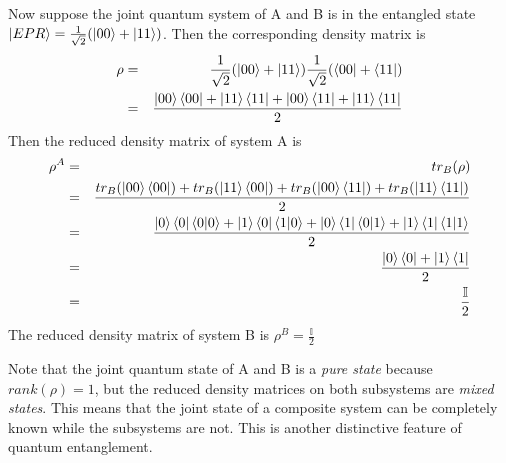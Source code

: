 \begin{example}
Now suppose the joint quantum system of A and B is in the entangled state $\ket{EPR}=\frac{1}{\sqrt{2}}(\ket{00}+\ket{11})$. Then the corresponding density matrix is
\begin{eqnarray}
\rho&=&\frac{1}{\sqrt{2}}(\ket{00}+\ket{11})\frac{1}{\sqrt{2}}(\bra{00}+\bra{11})\\
&=& \frac{\ket{00}\bra{00}+\ket{11}\bra{11}+\ket{00}\bra{11}+\ket{11}\bra{11}}{2}
\end{eqnarray}
Then the reduced density matrix of system A is 
\begin{eqnarray}
\rho^A&=&tr_B(\rho)\\
&=&\frac{tr_B(\ket{00}\bra{00})+tr_B(\ket{11}\bra{00})+tr_B(\ket{00}\bra{11})+tr_B(\ket{11}\bra{11})}{2}\\
&=&\frac{\ket{0}\bra{0}\braket{0|0}+\ket{1}\bra{0}\braket{1|0}+\ket{0}\bra{1}\braket{0|1}+\ket{1}\bra{1}\braket{1|1}}{2}\\
&=&\frac{\ket{0}\bra{0}+\ket{1}\bra{1}}{2}\\
&=&\frac{\mathbb{I}}{2}
\end{eqnarray}
The reduced density matrix of system B is $\rho^B=\frac{\mathbb{I}}{2}$
\end{example}
Note that the joint quantum state of A and B is a \emph{pure state} because $rank(\rho)=1$, but the reduced density matrices on both subsystems are \emph{mixed states}. This means that the joint state of a composite system can be completely known while the subsystems are not. This is another distinctive feature of quantum entanglement.